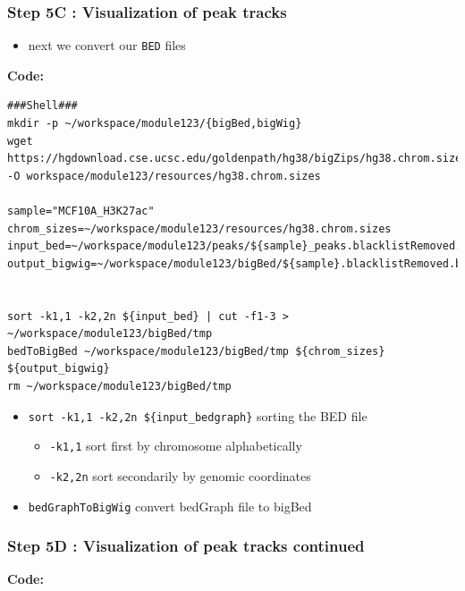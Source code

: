 \documentclass[
]{book}
\providecommand{\tightlist}{%
  \setlength{\itemsep}{0pt}\setlength{\parskip}{0pt}}
\begin{document}
\subsubsection{Step 5C : Visualization of peak tracks}\label{step-5c-visualization-of-peak-tracks}

\begin{itemize}
\tightlist
\item
  next we convert our \texttt{BED} files
\end{itemize}

\textbf{Code:}

\begin{verbatim}
###Shell###
mkdir -p ~/workspace/module123/{bigBed,bigWig}
wget https://hgdownload.cse.ucsc.edu/goldenpath/hg38/bigZips/hg38.chrom.sizes -O workspace/module123/resources/hg38.chrom.sizes

sample="MCF10A_H3K27ac"
chrom_sizes=~/workspace/module123/resources/hg38.chrom.sizes
input_bed=~/workspace/module123/peaks/${sample}_peaks.blacklistRemoved.narrowPeak
output_bigwig=~/workspace/module123/bigBed/${sample}.blacklistRemoved.bb


sort -k1,1 -k2,2n ${input_bed} | cut -f1-3 > ~/workspace/module123/bigBed/tmp
bedToBigBed ~/workspace/module123/bigBed/tmp ${chrom_sizes} ${output_bigwig}
rm ~/workspace/module123/bigBed/tmp
\end{verbatim}

\begin{itemize}
\tightlist
\item
  \texttt{sort\ -k1,1\ -k2,2n\ \$\{input\_bedgraph\}} sorting the BED file

  \begin{itemize}
  \tightlist
  \item
    \texttt{-k1,1} sort first by chromosome alphabetically
  \item
    \texttt{-k2,2n} sort secondarily by genomic coordinates
  \end{itemize}
\item
  \texttt{bedGraphToBigWig} convert bedGraph file to bigBed
\end{itemize}

\subsubsection{Step 5D : Visualization of peak tracks continued}\label{step-5d-visualization-of-peak-tracks-continued}

\textbf{Code:}
\end{document}
